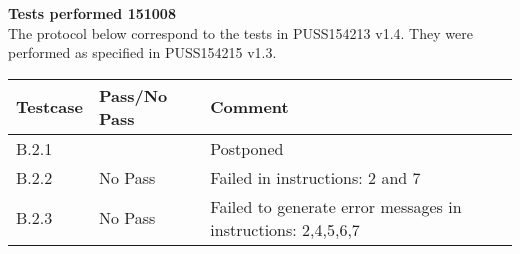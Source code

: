 \renewcommand{\testdate}{151008}
\textbf{Tests performed \testdate} \\
The protocol below correspond to the tests in PUSS154213 v1.4. They were performed as specified in PUSS154215 v1.3.
\begin{center}
  		\begin{tabular}{| p{3cm} | p{5cm} | p{5cm} |}
    		\hline
	    	\textbf{Testcase}			& \textbf{Pass/No Pass} 	& \textbf{Comment} \\ \hline
    		B.2.1		 						&  												& Postponed 				\\ \hline
    		B.2.2		 						& No Pass 										& Failed in instructions: 2 and 7				 \\	\hline
    		B.2.3		 						& No Pass 										& Failed to generate error messages in instructions: 2,4,5,6,7 				 \\	\hline
 		\end{tabular}
\end{center}